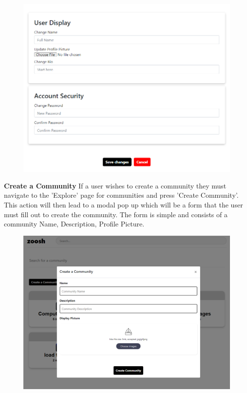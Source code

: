 \begin{figure}[H]
  \centering
  \includegraphics[scale=0.45]{img/edit.PNG}
  \label{fig:Edit Profile Screen.}
\end{figure}

\textbf{Create a Community}
\newline
If a user wishes to create a community they must navigate to the 'Explore' page for communities and press 'Create Community'. This action will then lead to a modal pop up which will be a form that the user must fill out to create the community. The form is simple and consists of a community Name, Description, Profile Picture.

\begin{figure}[H]
  \centering
  \includegraphics[scale=0.35]{img/createcommunity.PNG}
  \label{fig:Create Community Modal Form.}
\end{figure}

